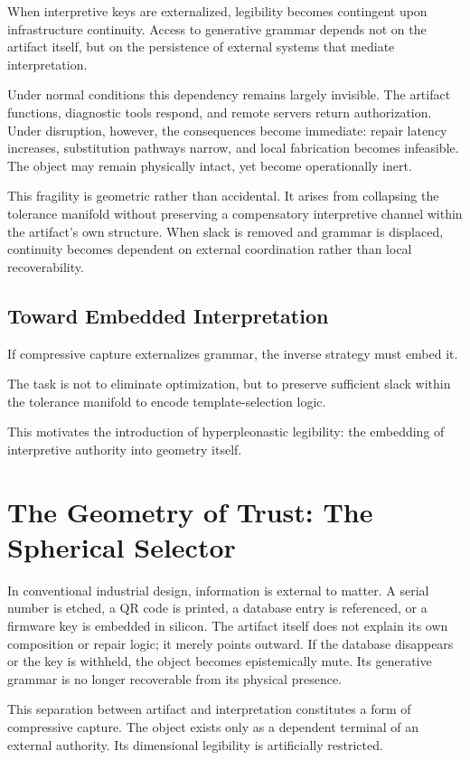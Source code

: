 \documentclass[11pt]{article}
\begin{document}
When interpretive keys are externalized, legibility becomes contingent
upon infrastructure continuity. Access to generative grammar depends not
on the artifact itself, but on the persistence of external systems that
mediate interpretation.

Under normal conditions this dependency remains largely invisible. The
artifact functions, diagnostic tools respond, and remote servers return
authorization. Under disruption, however, the consequences become
immediate: repair latency increases, substitution pathways narrow, and
local fabrication becomes infeasible. The object may remain physically
intact, yet become operationally inert.

This fragility is geometric rather than accidental. It arises from
collapsing the tolerance manifold without preserving a compensatory
interpretive channel within the artifact's own structure. When slack is
removed and grammar is displaced, continuity becomes dependent on
external coordination rather than local recoverability.

\subsection{Toward Embedded Interpretation}

If compressive capture externalizes grammar,
the inverse strategy must embed it.

The task is not to eliminate optimization,
but to preserve sufficient slack within
the tolerance manifold to encode template-selection logic.

This motivates the introduction of
hyperpleonastic legibility:
the embedding of interpretive authority into geometry itself.

\section{The Geometry of Trust: The Spherical Selector}

In conventional industrial design, information is external to matter. 
A serial number is etched, a QR code is printed, a database entry is 
referenced, or a firmware key is embedded in silicon. The artifact 
itself does not explain its own composition or repair logic; it merely 
points outward. If the database disappears or the key is withheld, the 
object becomes epistemically mute. Its generative grammar is no longer 
recoverable from its physical presence.

This separation between artifact and interpretation constitutes a form 
of compressive capture. The object exists only as a dependent terminal 
of an external authority. Its dimensional legibility is artificially 
restricted.
\end{document}
